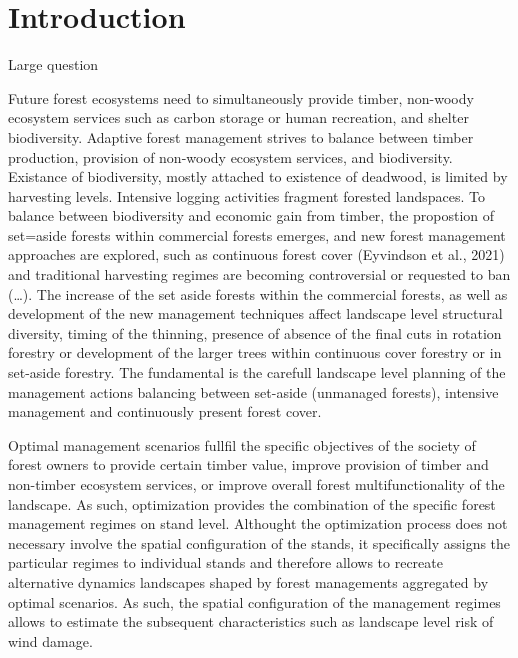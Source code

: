 \documentclass[]{elsarticle} %
\begin{document}
\newpage

\section{Introduction}\label{introduction}

Large question

Future forest ecosystems need to simultaneously provide timber,
non-woody ecosystem services such as carbon storage or human recreation,
and shelter biodiversity. Adaptive forest management strives to balance
between timber production, provision of non-woody ecosystem services,
and biodiversity. Existance of biodiversity, mostly attached to
existence of deadwood, is limited by harvesting levels. Intensive
logging activities fragment forested landspaces. To balance between
biodiversity and economic gain from timber, the propostion of set=aside
forests within commercial forests emerges, and new forest management
approaches are explored, such as continuous forest cover (Eyvindson et
al., 2021) and traditional harvesting regimes are becoming controversial
or requested to ban (\ldots{}). The increase of the set aside forests
within the commercial forests, as well as development of the new
management techniques affect landscape level structural diversity,
timing of the thinning, presence of absence of the final cuts in
rotation forestry or development of the larger trees within continuous
cover forestry or in set-aside forestry. The fundamental is the carefull
landscape level planning of the management actions balancing between
set-aside (unmanaged forests), intensive management and continuously
present forest cover.

Optimal management scenarios fullfil the specific objectives of the
society of forest owners to provide certain timber value, improve
provision of timber and non-timber ecosystem services, or improve
overall forest multifunctionality of the landscape. As such,
optimization provides the combination of the specific forest management
regimes on stand level. Althought the optimization process does not
necessary involve the spatial configuration of the stands, it
specifically assigns the particular regimes to individual stands and
therefore allows to recreate alternative dynamics landscapes shaped by
forest managements aggregated by optimal scenarios. As such, the spatial
configuration of the management regimes allows to estimate the
subsequent characteristics such as landscape level risk of wind damage.
\end{document}
